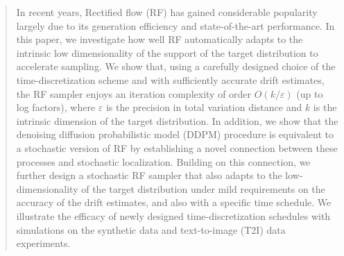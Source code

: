 \documentclass{article}
\theoremstyle{plain}
\theoremstyle{definition}
\theoremstyle{remark}
\begin{document}

\printAffiliationsAndNotice{}  %

\begin{abstract}
  In recent years, Rectified flow (RF) has gained considerable popularity largely due to its generation efficiency and state-of-the-art performance. In this paper, we investigate how well RF automatically adapts to the intrinsic low dimensionality of the support of the target distribution to accelerate sampling. We show that, using a carefully designed choice of the time-discretization scheme and with sufficiently accurate drift estimates, the RF sampler enjoys an iteration complexity of order $O(k/\varepsilon)$ (up to log factors), where $\varepsilon$ is the precision in total variation distance and $k$ is the intrinsic dimension of
 the target distribution. In addition, we show that the denoising diffusion probabilistic model (DDPM) procedure is equivalent to a stochastic version of RF by establishing a novel connection between these processes and stochastic localization. Building on this connection, we further design a stochastic RF sampler that also adapts to the low-dimensionality of the target distribution under mild requirements on the accuracy of the drift estimates, and also with a specific time schedule. We illustrate the efficacy of newly designed time-discretization schedules with simulations on the synthetic data and text-to-image (T2I) data experiments. 
\end{abstract}
\end{document}
